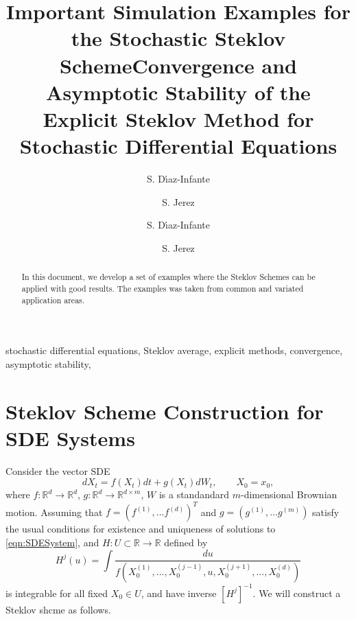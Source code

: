 \documentclass[review]{elsarticle}
\title{Important Simulation Examples for the Stochastic Steklov Scheme}
\author[sj]{S. D\'{\i}az-Infante}
\author[sj]{S. Jerez}
\begin{document}
	\begin{frontmatter}
		\title{Convergence and Asymptotic Stability  of  the Explicit
		Steklov Method for Stochastic Differential Equations 
		}%
		\author[sj]{S. D\'{\i}az-Infante}
		\author[sj]{S. Jerez}
		\address[sj]{
		Department of Applied Mathematics, CIMAT, Guanajuato, Gto., Mexico,
		36240.
		}
		\begin{abstract}
			In this document, we develop a set of examples where the Steklov Schemes can be applied
			with good results. The examples was taken from common and variated application areas.
		\end{abstract}
		\begin{keyword}
			stochastic differential equations, Steklov average,
			explicit methods, convergence, asymptotic stability,
		\end{keyword}
	\end{frontmatter}

	\section{Steklov Scheme Construction for SDE Systems }
		Consider the vector SDE
		\begin{equation}\label{eqn:SDESystem}
			dX_t = f(X_t)dt + g(X_t)dW_t, \qquad X_0 = x_0,
		\end{equation}
		where $f:\mathbb{R}^d \to \mathbb{R}^d$, $g:\mathbb{R}^d \to \mathbb{R}^{d \times m}$, 
		$W$ is a standandard $m$-dimensional Brownian motion.
		Assuming that $f =(f^{(1)},\dots f^{(d)})^T$ and $g = (g^{(1)}, \dots g^{(m)}) $ satisfy
		the usual conditions for existence and uniqueness of solutions to \eqref{eqn:SDESystem}, 
		and 
		$H: U\subset \mathbb{R} \to \mathbb{R}$ defined by
		\begin{equation}
			H^j(u) = \int \frac{du}{
				f(X^{(1)}_{0}, \dots, X^{(j-1)}_{0}, u, X^{{(j+1)}}_{0}, \dots,  X^{(d)}_{0})
			}
		\end{equation}
		is integrable for all fixed $X_0 \in U$, and have inverse $[H^j]^{-1}$. We will construct a 
		Steklov shcme as follows.
		
\end{document}
